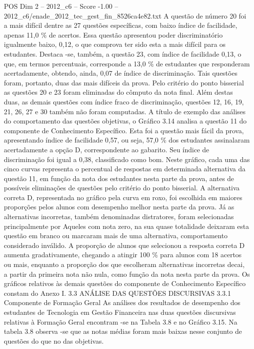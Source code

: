 \begin{textsample}{POS Dim 2 – 2012\_c6 – Score -1.00 – 2012\_c6/enade\_2012\_tec\_gest\_fin\_8526ca4e82.txt}
A questão de número 20 foi a mais difícil dentre as 27 questões específicas, com baixo índice de facilidade, apenas 11,0 \% de acertos.
Essa questão apresentou poder discriminatório igualmente baixo, 0,12, o que comprova ter sido esta a mais difícil para os estudantes.
Destaca -se, também, a questão 23, com índice de facilidade 0,13, o que, em termos percentuais, corresponde a 13,0 \% de estudantes que responderam acertadamente, obtendo, ainda, 0,07 de índice de discriminação.
Tais questões foram, portanto, duas das mais difíceis da prova.
Pelo critério do ponto bisserial as questões 20 e 23 foram eliminadas do cômputo da nota final.
Além destas duas, as demais questões com índice fraco de discriminação, questões 12, 16, 19, 21, 26, 27 e 30 também não foram computadas.
A título de exemplo das análises do comportamento das questões objetivas, o Gráfico 3.14 analisa a questão 11 do componente de Conhecimento Específico.
Esta foi a questão mais fácil da prova, apresentando índice de facilidade 0,57, ou seja, 57,0 \% dos estudantes assinalaram acertadamente a opção D, correspondente ao gabarito.
Seu índice de discriminação foi igual a 0,38, classificado como bom.
Neste gráfico, cada uma das cinco curvas representa o percentual de respostas em determinada alternativa da questão 11, em função da nota dos estudantes nesta parte da prova, antes de possíveis eliminações de questões pelo critério do ponto bisserial.
A alternativa correta D, representada no gráfico pela curva em roxo, foi escolhida em maiores proporções pelos alunos com desempenho melhor nesta parte da prova.
Já as alternativas incorretas, também denominadas distratores, foram selecionadas principalmente por Aqueles com nota zero, na sua quase totalidade deixaram esta questão em branco ou marcaram mais de uma alternativa, comportamento considerado inválido.
A proporção de alunos que selecionou a resposta correta D aumenta gradativamente, chegando a atingir 100 \% para alunos com 18 acertos ou mais, enquanto a proporção dos que escolheram alternativas incorretas decai, a partir da primeira nota não nula, como função da nota nesta parte da prova.
Os gráficos relativos às demais questões do componente de Conhecimento Específico constam do Anexo I. 3.3 ANÁLISE DAS QUESTÕES DISCURSIVAS 3.3.1 Componente de Formação Geral As análises dos resultados de desempenho dos estudantes de Tecnologia em Gestão Financeira nas duas questões discursivas relativas à Formação Geral encontram -se na Tabela 3.8 e no Gráfico 3.15.
Na tabela 3.8 observa -se que as notas médias foram mais baixas nesse conjunto de questões do que no das objetivas.

\end{textsample}
